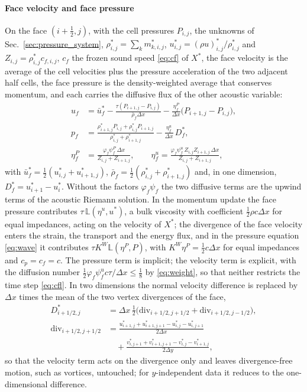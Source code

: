\paragraph{Face velocity and face pressure}
On the face $(i+\tfrac12,j)$, with the cell pressures $P_{i,j}$, the unknowns of Sec.~\ref{sec:pressure_system}, $\rho^*_{i,j}=\sum_km^*_{k,i,j}$, $u^*_{i,j}=(\rho u)^*_{i,j}/\rho^*_{i,j}$ and $Z_{i,j}=\rho^*_{i,j}c_{f,i,j}$, $c_f$ the frozen
sound speed \eqref{eq:cf} of $X^*$, the face velocity is the average of the cell velocities plus the pressure acceleration of the two
adjacent half cells, the face pressure is the density-weighted average that conserves momentum, and each carries the
diffusive flux of the other acoustic variable:
\begin{equation}
\begin{aligned}
u_f&=\bar u^*_f-\frac{\tau(P_{i+1,j}-P_{i,j})}{\bar\rho_f\Delta x}-\frac{\eta^P_f}{\Delta x}\big(P_{i+1,j}-P_{i,j}\big),\\
p_f&=\frac{\rho^*_{i+1,j}P_{i,j}+\rho^*_{i,j}P_{i+1,j}}{\rho^*_{i,j}+\rho^*_{i+1,j}}-\frac{\eta^u_f}{\Delta x}\,D^*_f,\\
\eta^P_f&=\frac{\varphi_f\psi^P_f\,\Delta x}{Z_{i,j}+Z_{i+1,j}},\qquad \eta^u_f=\frac{\varphi_f\psi^u_f\,Z_{i,j}Z_{i+1,j}\,\Delta x}{Z_{i,j}+Z_{i+1,j}},
\end{aligned}
\label{eq:faces}
\end{equation}
with $\bar u^*_f=\tfrac12(u^*_{i,j}+u^*_{i+1,j})$, $\bar\rho_f=\tfrac12(\rho^*_{i,j}+\rho^*_{i+1,j})$ and, in one dimension, $D^*_f=u^*_{i+1}-u^*_i$. Without the
factors $\varphi_f\psi_f$ the two diffusive terms are the upwind terms of the acoustic Riemann solution. In the momentum update the
face pressure contributes $\tau\,\mathbb L(\eta^u,u^*)$, a bulk viscosity with coefficient $\tfrac12\rho c\Delta x$ for equal impedances, acting on
the velocity of $X^*$; the
divergence of the face velocity enters the strain, the transport and the energy flux, and in the pressure equation
\eqref{eq:wave} it contributes $\tau K^W\mathbb L(\eta^P,P)$, with $K^W\eta^P=\tfrac12c\Delta x$ for equal impedances and $c_p=c_f=c$. The pressure term is implicit; the velocity term is explicit,
with the diffusion number $\tfrac12\varphi_f\psi^u_fc\tau/\Delta x\le\tfrac18$ by \eqref{eq:weight}, so that neither restricts the time
step \eqref{eq:cfl}. In two dimensions the
normal velocity difference is replaced by $\Delta x$ times the mean of the two vertex divergences of the face,
\begin{equation}
\begin{aligned}
D^*_{i+1/2,j}&=\Delta x\,\tfrac12\big(\mathrm{div}_{i+1/2,j+1/2}+\mathrm{div}_{i+1/2,j-1/2}\big),\\
\mathrm{div}_{i+1/2,j+1/2}&=\frac{u^*_{i+1,j}+u^*_{i+1,j+1}-u^*_{i,j}-u^*_{i,j+1}}{2\Delta x}\\
&\quad+\frac{v^*_{i,j+1}+v^*_{i+1,j+1}-v^*_{i,j}-v^*_{i+1,j}}{2\Delta y},
\end{aligned}
\label{eq:vertex_div}
\end{equation}
so that the velocity term acts on the divergence only and leaves divergence-free motion, such as vortices, untouched;
for $y$-independent data it reduces to the one-dimensional difference.


